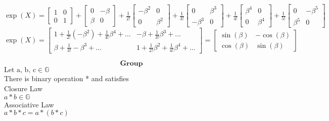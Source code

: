 \documentclass{book}
\begin{document}
$
    \exp(X) = 
        \begin{bmatrix}
        1 & 0 \\
        0 & 1 
        \end{bmatrix}
        +
        \begin{bmatrix}
        0 & -\beta \\
        \beta & 0 
        \end{bmatrix}
        +
        \frac{1}{2!}
        \begin{bmatrix}
        -\beta^{2} & 0 \\
        0 & \beta^{2} 
        \end{bmatrix}
        +
        \frac{1}{3!}
        \begin{bmatrix}
        0 & \beta^{3} \\
        -\beta^{3} & 0 
        \end{bmatrix}
        +
        \frac{1}{4!}
        \begin{bmatrix}
        \beta^{4} & 0 \\
         0 & \beta^{4} 
        \end{bmatrix}
        +
        \frac{1}{5!}
        \begin{bmatrix}
        0 & -\beta^{5}\\
        \beta^{5} & 0 
        \end{bmatrix}
$\\
$
    \exp(X) = 
        \begin{bmatrix}
        1 + \frac{1}{2!}(-\beta^{2}) + \frac{1}{4!}\beta^{4} + ... & -\beta + \frac{1}{3!}\beta^{3} + ...\\
        \beta + \frac{1}{3!}-\beta^{3} + ... & 1 + \frac{1}{2!}\beta^{2} + \frac{1}{4!}\beta^{4} + ...
        \end{bmatrix}
        = 
        \begin{bmatrix}
        \sin(\beta) & -\cos(\beta)\\
        \cos(\beta) & \sin(\beta)
        \end{bmatrix}
$

\[ \textbf{Group} \]
$\text{Let a, b, c} \in \mathbb{G} $\\
There is binary operation * and satisfies\\

Closure Law\\
$ a*b \in \mathbb{G} $\\

Associative Law\\
$ a*b*c = a*(b*c)$\\
\end{document}
